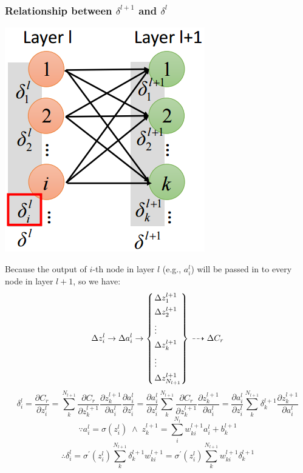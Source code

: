 \documentclass{article}
\begin{document}
\subsubsection{Relationship between $\delta^{l+1}$ and $\delta^l$} 
\begin{center}
\includegraphics[scale=0.6]{grad_delta}
\end{center}
Because the output of $i$-th node in layer $l$ (e.g., $a^l_i$) will be passed in to every node in layer $l+1$, so we have:
\[
\Delta z^l_i \rightarrow \Delta a^l_i \rightarrow 
\begin{dcases*}
\begin{rcases*}
\Delta z^{l+1}_1 \\ \Delta z^{l+1}_2 \\ \vdots \\ \Delta z^{l+1}_k \\ \vdots \\ \Delta z^{l+1}_{N_{l+1}} 
\end{rcases*} 
\end{dcases*} \dashrightarrow \Delta C_r
\]
\[
\delta^l_i = \frac{\partial C_r}{\partial z^l_i} = \sum^{N_{l+1}}_k\frac{\partial C_r}{\partial z^{l+1}_k}\frac{\partial z^{l+1}_k}{\partial a^l_i}\frac{\partial a^l_i}{\partial z^l_i} = \frac{\partial a^l_i}{\partial z^l_i}\sum^{N_{l+1}}_k\frac{\partial C_r}{\partial z^{l+1}_k}\frac{\partial z^{l+1}_k}{\partial a^l_i} = \frac{\partial a^l_i}{\partial z^l_i}\sum^{N_{l+1}}_k\delta^{l+1}_k\frac{\partial z^{l+1}_k}{\partial a^l_i}
\]
\[
\because a^l_i = \sigma(z^l_i) \; \land \; z^{l+1}_k = \sum^{N_l}_i w^{l+1}_{ki}a^l_i + b^{l+1}_k
\] 
\[
\therefore \delta^l_i = \sigma^\prime(z^l_i)\sum^{N_{l+1}}_k\delta^{l+1}_kw^{l+1}_{ki} = \sigma^\prime(z^l_i)\sum^{N_{l+1}}_kw^{l+1}_{ki}\delta^{l+1}_k
\]
\end{document}
